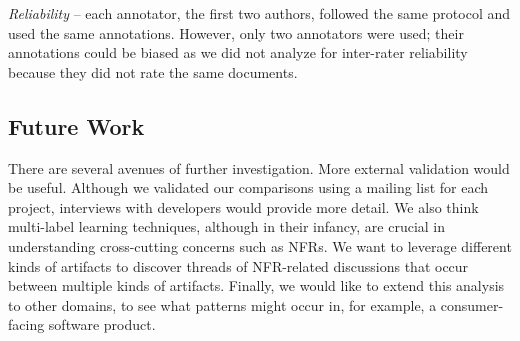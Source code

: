 \documentclass[smallextended]{svjour3}       %
\begin{document}
\emph{Reliability} -- each annotator, the first two authors, followed the same protocol and used the same annotations. 
However, only two annotators were used; their annotations could be
biased as we did not analyze for inter-rater reliability because they
did not rate the same documents.

\balance
\newpage

\subsection{Future Work}
There are several avenues of further investigation.  
More external validation would be useful. 
Although we validated our comparisons using a mailing list for each project, interviews with developers would provide more detail. 
We also think multi-label learning techniques, although in their infancy, are crucial in understanding cross-cutting concerns such as NFRs. 
We want to leverage different kinds of artifacts to discover threads of NFR-related discussions that occur between multiple kinds of artifacts.
Finally, we would like to extend this analysis to other domains, to see what patterns might occur in, for example, a consumer-facing software product.
\end{document}
